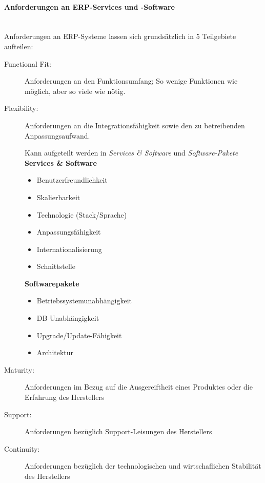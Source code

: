 \documentclass[a4paper, 11pt]{article}
\begin{document}
\paragraph{Anforderungen an ERP-Services und -Software}\mbox{}\\
Anforderungen an ERP-Systeme lassen sich grundsätzlich in 5 Teilgebiete aufteilen:
\begin{description}
	\item[Functional Fit: ] Anforderungen an den Funktionsumfang; So wenige Funktionen wie möglich, aber so viele wie nötig.
	\item[Flexibility: ] Anforderungen an die Integrationsfähigkeit sowie den zu betreibenden Anpassungsaufwand.
		 
		 \noindent Kann aufgeteilt werden in \textit{Services \& Software} und \textit{Software-Pakete}\\
		\textbf{Services \& Software}
		\begin{multicols}{2}
			\begin{itemize}
				\item Benutzerfreundlichkeit
				\item Skalierbarkeit
				\item Technologie (Stack/Sprache)
				\item Anpassungsfähigkeit
				\item Internationalisierung
				\item Schnittstelle
			\end{itemize}
		\end{multicols}
	
		\textbf{Softwarepakete}
		\begin{multicols}{2}
			\begin{itemize}
				\item Betriebssystemunabhängigkeit
				\item DB-Unabhängigkeit
				\item Upgrade/Update-Fähigkeit
				\item Architektur
			\end{itemize}
		\end{multicols}
	\item[Maturity: ] Anforderungen im Bezug auf die Ausgereiftheit eines Produktes oder die Erfahrung des Herstellers
	\item[Support: ] Anforderungen bezüglich Support-Leisungen des Herstellers
	\item[Continuity: ] Anforderungen bezüglich der technologischen und wirtschaflichen Stabilität des Herstellers
\end{description}
\end{document}
